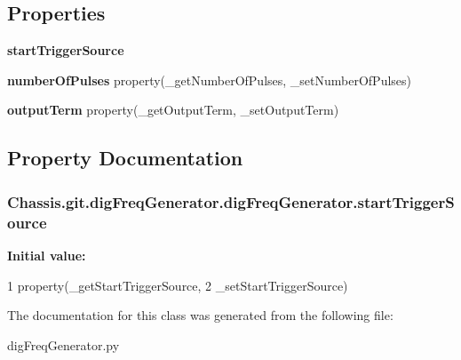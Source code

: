 \subsection*{Properties}
\begin{DoxyCompactItemize}
\item 
{\bfseries start\-Trigger\-Source}
\item 
\hypertarget{class_chassis_8git_1_1dig_freq_generator_1_1dig_freq_generator_a05973568cba45becb201acc2bd360bc3}{{\bfseries number\-Of\-Pulses} property(\-\_\-get\-Number\-Of\-Pulses, \-\_\-set\-Number\-Of\-Pulses)}\label{class_chassis_8git_1_1dig_freq_generator_1_1dig_freq_generator_a05973568cba45becb201acc2bd360bc3}

\item 
\hypertarget{class_chassis_8git_1_1dig_freq_generator_1_1dig_freq_generator_aef6337ef17d8e8ee57b954262a705015}{{\bfseries output\-Term} property(\-\_\-get\-Output\-Term, \-\_\-set\-Output\-Term)}\label{class_chassis_8git_1_1dig_freq_generator_1_1dig_freq_generator_aef6337ef17d8e8ee57b954262a705015}

\end{DoxyCompactItemize}


\subsection{Property Documentation}
\hypertarget{class_chassis_8git_1_1dig_freq_generator_1_1dig_freq_generator_a0ed03acaf135a389453868ed2f45d31a}{
\subsubsection[{start\-Trigger\-Source}]{\setlength{\rightskip}{0pt plus 5cm}Chassis.\-git.\-dig\-Freq\-Generator.\-dig\-Freq\-Generator.\-start\-Trigger\-Source\hspace{0.3cm}{\ttfamily [static]}}}\label{class_chassis_8git_1_1dig_freq_generator_1_1dig_freq_generator_a0ed03acaf135a389453868ed2f45d31a}
{\bfseries Initial value\-:}
\begin{DoxyCode}
1 property(\_getStartTriggerSource,
2             \_setStartTriggerSource)
\end{DoxyCode}


The documentation for this class was generated from the following file\-:\begin{DoxyCompactItemize}
\item 
dig\-Freq\-Generator.\-py\end{DoxyCompactItemize}
